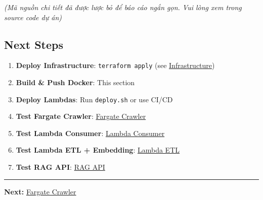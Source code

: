 \emph{(Mã nguồn chi tiết đã được lược bỏ để báo cáo ngắn gọn. Vui lòng
xem trong source code dự án)}

\hypertarget{next-steps}{%
\subsection{Next Steps}}

\begin{enumerate}
\def\labelenumi{\arabic{enumi}.}
\tightlist
\item
  \textbf{Deploy Infrastructure}: \texttt{terraform\ apply} (see
  \href{5.3-Infrastructure/}{Infrastructure})
\item
  \textbf{Build \& Push Docker}: This section
\item
  \textbf{Deploy Lambdas}: Run \texttt{deploy.sh} or use CI/CD
\item
  \textbf{Test Fargate Crawler}: \href{5.10-Fargate-Crawler/}{Fargate
  Crawler}
\item
  \textbf{Test Lambda Consumer}: \href{5.11-Lambda-Consumer/}{Lambda
  Consumer}
\item
  \textbf{Test Lambda ETL + Embedding}: \href{5.12-Lambda-ETL/}{Lambda
  ETL}
\item
  \textbf{Test RAG API}: \href{5.13-RAG-API/}{RAG API}
\end{enumerate}

\begin{center}\rule{0.5\linewidth}{0.5pt}\end{center}

\textbf{Next:} \href{5.10-Fargate-Crawler/}{Fargate Crawler}
